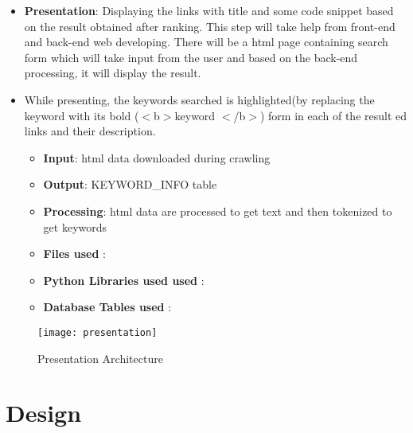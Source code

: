 \documentclass{scrreprt}
\begin{document}
\begin{itemize}

\item\textbf {Presentation}: Displaying the links with title and some code snippet based on the result obtained after ranking. This step will take help from front-end and back-end web developing. There will be a html page containing search form which will take input from the user and based on the back-end processing, it will display the result.
\item While presenting, the keywords searched is highlighted(by replacing the keyword with its bold ($<$b$>$keyword $<$/b$>$) form in each of the result ed links and their description.

 \begin{itemize}
     \item \textbf{Input}: html data downloaded during crawling
    \item \textbf{Output}: KEYWORD_INFO table
    \item \textbf{Processing}: html data are processed to get text and then tokenized to get keywords
     \item \textbf{Files used} :
        \item \textbf{Python Libraries used used} : 
        
        \item \textbf{Database Tables used} : 
        

     \end{itemize}

 
\end{itemize}


\begin{figure}[h]
\begin{center}
\texttt{[image: presentation]}
\caption{Presentation Architecture}
\end{center}
\end{figure} 

\chapter{ Design}
\end{document}
